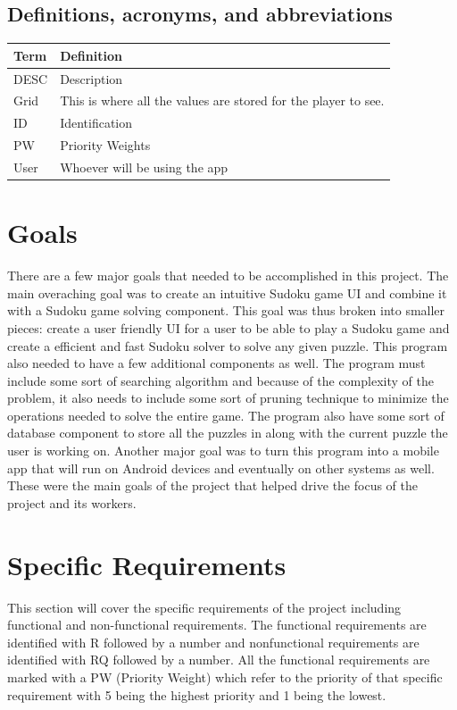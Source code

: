 \documentclass{article}
\begin{document}
\subsection{Definitions, acronyms, and abbreviations}

\begin{tabular}{ | m{8em} | m{24em}|  } 
\hline
\textbf{Term}& \textbf{Definition}  \\ 
\hline
DESC & Description  \\ 
\hline
Grid & This is where all the values are stored for the player to see.  \\ 
\hline
ID & Identification  \\ 
\hline
PW & Priority Weights  \\ 
\hline
User & Whoever will be using the app  \\ 
\hline
\end{tabular}

 

\section{Goals}
There are a few major goals that needed to be accomplished in this project. The main overaching goal was to create an intuitive Sudoku game UI and combine it with a Sudoku game solving component. This goal was thus broken into smaller pieces: create a user friendly UI for a user to be able to play a Sudoku game and create a efficient and fast Sudoku solver to solve any given puzzle. This program also needed to have a few additional components as well. The program must include some sort of searching algorithm and because of the complexity of the problem, it also needs to include some sort of pruning technique to minimize the operations needed to solve the entire game. The program also have some sort of database component to store all the puzzles in along with the current puzzle the user is working on. Another major goal was to turn this program into a mobile app that will run on Android devices and eventually on other systems as well. These were the main goals of the project that helped drive the focus of the project and its workers.

 
\section{Specific Requirements}
This section will cover the specific requirements of the project including functional and non-functional requirements. The functional requirements are identified with R followed by a number and nonfunctional requirements are identified with RQ followed by a number. All the functional requirements are marked with a PW (Priority Weight) which refer to the priority of that specific requirement with 5 being the highest priority and 1 being the lowest.
\end{document}
